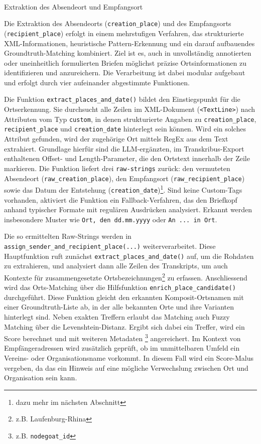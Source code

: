 \documentclass[12pt, a4paper, ngerman, bidi=default]{article}
\makeatletter
\newcommand{\code}[1]{\colorbox{VeryLightGray}{\texttt{#1}}} %
\let\oldparagraph\paragraph%
\renewcommand{\paragraph}{
    \@ifstar%
      \xxxParagraphStar%
      \xxxParagraphNoStar%
 }
\newcommand{\xxxParagraphStar}[1]{\oldparagraph*{#1}\mbox{}}
\newcommand{\xxxParagraphNoStar}[1]{\oldparagraph{#1}\mbox{}}
\makeatother
\begin{document}
\paragraph{Extraktion des Absendeort und Empfangsort}

Die Extraktion des Absendeorts (\code{creation\_place}) und des Empfangsorts (\code{recipient\_place}) erfolgt in einem mehrstufigen Verfahren, das strukturierte XML-Informationen, heuristische Pattern-Erkennung und ein darauf aufbauendes Groundtruth-Matching kombiniert. Ziel ist es, auch in unvollständig annotierten oder uneinheitlich formulierten Briefen möglichst präzise Ortsinformationen zu identifizieren und anzureichern. Die Verarbeitung ist dabei modular aufgebaut und erfolgt durch vier aufeinander abgestimmte Funktionen.

Die Funktion \code{extract\_places\_and\_date()} bildet den Einstiegspunkt für die Ortserkennung. Sie durchsucht alle Zeilen im XML-Dokument (\code{<TextLine>}) nach Attributen vom Typ \texttt{custom}, in denen strukturierte Angaben zu \code{creation\_place}, \code{recipient\_place} und \code{creation\_date} hinterlegt sein können. Wird ein solches Attribut gefunden, wird der zugehörige Ort mittels RegEx aus dem Text extrahiert. Grundlage hierfür sind die LLM-ergänzten, im Transkribus-Export enthaltenen Offset- und Length-Parameter, die den Ortstext innerhalb der Zeile markieren. Die Funktion liefert drei \code{raw-strings} zurück: den vermuteten Absendeort (\code{raw\_creation\_place}), den Empfangsort (\code{raw\_recipient\_place}) sowie das Datum der Entstehung (\code{creation\_date})\footnote{dazu mehr im nächsten Abschnitt}. Sind keine Custom-Tags vorhanden, aktiviert die Funktion ein Fallback-Verfahren, das den Briefkopf anhand typischer Formate mit regulären Ausdrücken analysiert. Erkannt werden insbesondere Muster wie \texttt{Ort, den dd.mm.yyyy} oder \texttt{An ... in Ort}.

Die so ermittelten Raw-Strings werden in \code{assign\_sender\_and\_recipient\_place(...)} weiterverarbeitet. Diese Hauptfunktion ruft zunächst \code{extract\_places\_and\_date()} auf, um die Rohdaten zu extrahieren, und analysiert dann alle Zeilen des Transkripts, um auch Kontexte für zusammengesetzte Ortsbezeichnungen\footnote{z.B. Laufenburg-Rhina} zu erfassen. Anschliessend wird das Orts-Matching über die Hilfsfunktion \code{enrich\_place\_candidate()} durchgeführt. Diese Funktion gleicht den erkannten Komposit-Ortsnamen mit einer Groundtruth-Liste ab, in der alle bekannten Orte und ihre Varianten hinterlegt sind. Neben exakten Treffern erlaubt das Matching auch Fuzzy Matching über die Levenshtein-Distanz. Ergibt sich dabei ein Treffer, wird ein Score berechnet und mit weiteren Metadaten \footnote{z.B. \code{nodegoat\_id}} angereichert. Im Kontext von Empfängeradressen wird zusätzlich geprüft, ob im unmittelbaren Umfeld ein Vereins- oder Organisationsname vorkommt. In diesem Fall wird ein Score-Malus vergeben, da  das ein Hinweis auf eine mögliche Verwechslung zwischen Ort und Organisation sein kann.
\end{document}

